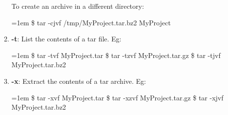 \begin{flushleft}
\begin{itemize}
\begin{enumerate}
			To create an archive in a different directory:
			\begin{tcolorbox}[breakable,notitle,boxrule=-0pt,colback=black,colframe=black]
				\color{green}
				\font=1em
				\$ tar -cjvf /tmp/MyProject.tar.bz2  MyProject
				\font=4pt
			\end{tcolorbox}		
			\bigskip
			\bigskip
			\item \textbf{-t}: List the contents of a tar file.
			\newline
			Eg: 
			\begin{tcolorbox}[breakable,notitle,boxrule=-0pt,colback=black,colframe=black]
				\color{green}
				\font=1em
				\$ tar -tvf MyProject.tar
				\newline
				\color{green}
				\$ tar -tzvf MyProject.tar.gz
				\newline
				\color{green}
				\$  tar -tjvf MyProject.tar.bz2
				\font=4pt
			\end{tcolorbox}		

			\bigskip\bigskip
			\item \textbf{-x}: Extract the contents of a tar archive.
			\newline
			Eg:
			\begin{tcolorbox}[breakable,notitle,boxrule=-0pt,colback=black,colframe=black]
				\color{green}
				\fontdimen2\font=1em
				\$ tar -xvf MyProject.tar
				\newline
				\$ tar -xzvf MyProject.tar.gz
				\newline
				\$ tar -xjvf MyProject.tar.bz2
				\fontdimen2\font=4pt
			\end{tcolorbox}		
		\end{enumerate}
		\bigskip

		
	\end{itemize} 
	
\end{flushleft}

\newpage

